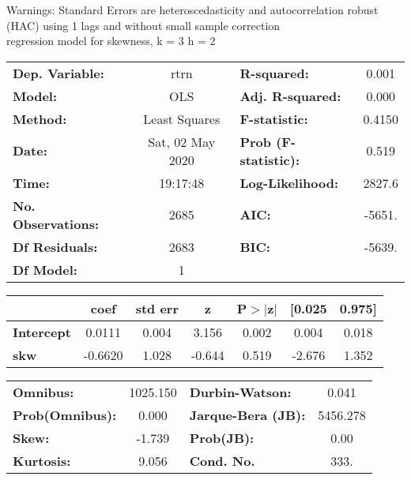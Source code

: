 Warnings: \newline
 [1] Standard Errors are heteroscedasticity and autocorrelation robust (HAC) using 1 lags and without small sample correction\\ 

regression model for skewness, k = 3 h = 2\begin{center}
\begin{tabular}{lclc}
\toprule
\textbf{Dep. Variable:}    &       rtrn       & \textbf{  R-squared:         } &     0.001   \\
\textbf{Model:}            &       OLS        & \textbf{  Adj. R-squared:    } &     0.000   \\
\textbf{Method:}           &  Least Squares   & \textbf{  F-statistic:       } &    0.4150   \\
\textbf{Date:}             & Sat, 02 May 2020 & \textbf{  Prob (F-statistic):} &    0.519    \\
\textbf{Time:}             &     19:17:48     & \textbf{  Log-Likelihood:    } &    2827.6   \\
\textbf{No. Observations:} &        2685      & \textbf{  AIC:               } &    -5651.   \\
\textbf{Df Residuals:}     &        2683      & \textbf{  BIC:               } &    -5639.   \\
\textbf{Df Model:}         &           1      & \textbf{                     } &             \\
\bottomrule
\end{tabular}
\begin{tabular}{lcccccc}
                   & \textbf{coef} & \textbf{std err} & \textbf{z} & \textbf{P$> |$z$|$} & \textbf{[0.025} & \textbf{0.975]}  \\
\midrule
\textbf{Intercept} &       0.0111  &        0.004     &     3.156  &         0.002        &        0.004    &        0.018     \\
\textbf{skw}       &      -0.6620  &        1.028     &    -0.644  &         0.519        &       -2.676    &        1.352     \\
\bottomrule
\end{tabular}
\begin{tabular}{lclc}
\textbf{Omnibus:}       & 1025.150 & \textbf{  Durbin-Watson:     } &    0.041  \\
\textbf{Prob(Omnibus):} &   0.000  & \textbf{  Jarque-Bera (JB):  } & 5456.278  \\
\textbf{Skew:}          &  -1.739  & \textbf{  Prob(JB):          } &     0.00  \\
\textbf{Kurtosis:}      &   9.056  & \textbf{  Cond. No.          } &     333.  \\
\bottomrule
\end{tabular}
\end{center}

